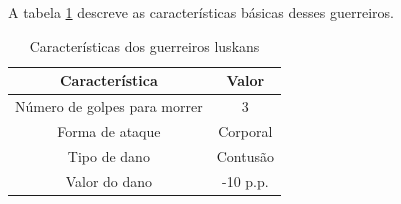 A tabela \ref{table:luskans} descreve as características básicas desses guerreiros.
\begin{table}[H]
\begin{center}
\begin{tabular}{|c|c|}
\hline 
\textbf{Característica} & \textbf{Valor} \\ 
\hline 
Número de golpes para morrer & 3\\ 
\hline 
Forma de ataque & Corporal\\ 
\hline 
Tipo de dano &  Contusão \\ 
\hline 
Valor do dano & -10 p.p. \\ 
\hline 
\end{tabular} 
\end{center}
\caption{Características dos guerreiros luskans}
\label{table:luskans}
\end{table}
